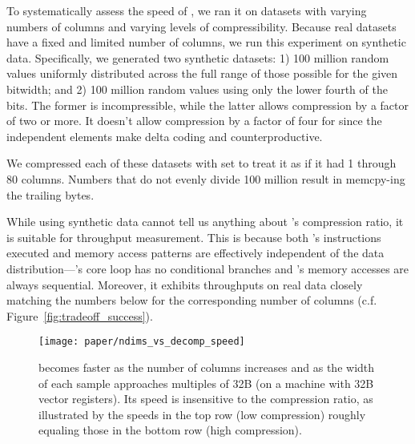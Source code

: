 To systematically assess the speed of \minesp, we ran it on datasets with varying numbers of columns and varying levels of compressibility. Because real datasets have a fixed and limited number of columns, we run this experiment on synthetic data. Specifically, we generated two synthetic datasets: 1) 100 million random values uniformly distributed across the full range of those possible for the given bitwidth; and 2) 100 million random values using only the lower fourth of the bits. The former is incompressible, while the latter allows compression by a factor of two or more. It doesn't allow compression by a factor of four for \minesp since the independent elements make delta coding and \fire counterproductive.

We compressed each of these datasets with \minesp set to treat it as if it had 1 through 80 columns. Numbers that do not evenly divide 100 million result in \minesp memcpy-ing the trailing bytes.

While using synthetic data cannot tell us anything about \mine's compression ratio, it is suitable for throughput measurement. This is because both \mine's instructions executed and memory access patterns are effectively independent of the data distribution---\mine's core loop has no conditional branches and \minesp's memory accesses are always sequential. Moreover, it exhibits throughputs on real data closely matching the numbers below for the corresponding number of columns (c.f. Figure~\ref{fig:tradeoff_success}). %

\begin{figure}[h]
\begin{center}
    \texttt{[image: paper/ndims\_vs\_decomp\_speed]}
    \caption{\minesp becomes faster as the number of columns increases and as the width of each sample approaches multiples of 32B (on a machine with 32B vector registers). Its speed is insensitive to the compression ratio, as illustrated by the speeds in the top row (low compression) roughly equaling those in the bottom row (high compression).}
    \label{fig:ndims_vs_decomp_speed}
\end{center}
\end{figure}

